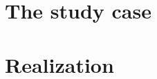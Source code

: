 \documentclass[
		twoside,openright,titlepage,numbers=noenddot,headinclude,%
	 	footinclude=true,cleardoublepage=empty,
		dottedtoc, %
		BCOR=5mm,paper=a4,fontsize=11pt, %
		ngerman,american, %
		]{scrreprt}
\begin{document}

\cleardoublepage %


\cleardoublepage %


\cleardoublepage %


\part{The study case}
\cleardoublepage %


\cleardoublepage %


\part{Realization}
\cleardoublepage %


\cleardoublepage %


\cleardoublepage %



\end{document}
